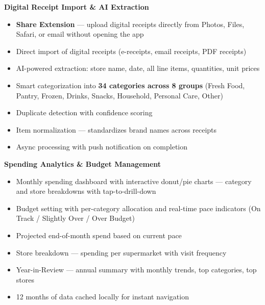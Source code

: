 \documentclass[11pt,a4paper]{article}
\begin{document}
\begin{appbox}
{\color{milopurple!80}\fontsize{14}{17}\selectfont\bfseries Digital Receipt Import \& AI Extraction}

\vspace{0.3em}
\begin{itemize}[leftmargin=1em, itemsep=2pt, font=\small]
  \item \textbf{Share Extension} --- upload digital receipts directly from Photos, Files, Safari, or email without opening the app
  \item Direct import of digital receipts (e-receipts, email receipts, PDF receipts)
  \item AI-powered extraction: store name, date, all line items, quantities, unit prices
  \item Smart categorization into \textbf{34 categories across 8 groups} (Fresh Food, Pantry, Frozen, Drinks, Snacks, Household, Personal Care, Other)
  \item Duplicate detection with confidence scoring
  \item Item normalization --- standardizes brand names across receipts
  \item Async processing with push notification on completion
\end{itemize}
\end{appbox}

\vspace{0.5em}

\begin{appbox}
{\color{milopurple!80}\fontsize{14}{17}\selectfont\bfseries Spending Analytics \& Budget Management}

\vspace{0.3em}
\begin{itemize}[leftmargin=1em, itemsep=2pt, font=\small]
  \item Monthly spending dashboard with interactive donut/pie charts --- category and store breakdowns with tap-to-drill-down
  \item Budget setting with per-category allocation and real-time pace indicators (On Track / Slightly Over / Over Budget)
  \item Projected end-of-month spend based on current pace
  \item Store breakdown --- spending per supermarket with visit frequency
  \item Year-in-Review --- annual summary with monthly trends, top categories, top stores
  \item 12 months of data cached locally for instant navigation
\end{itemize}
\end{appbox}
\end{document}
